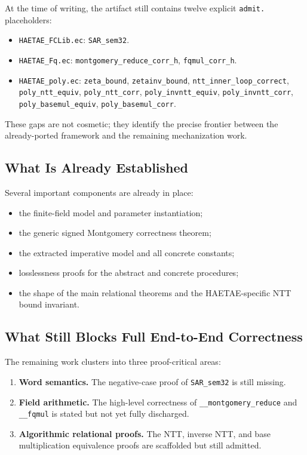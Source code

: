 \documentclass[11pt]{article}
\newcommand{\file}[1]{\texttt{#1}}
\newcommand{\ec}[1]{\texttt{#1}}
\newcommand{\todoec}{\textcolor{red!60!black}{\texttt{admit.}}}
\begin{document}
At the time of writing, the artifact still contains twelve explicit
\todoec{} placeholders:
\begin{itemize}[leftmargin=1.5em]
\item \file{HAETAE\_FCLib.ec}: \ec{SAR\_sem32}.
\item \file{HAETAE\_Fq.ec}: \ec{montgomery\_reduce\_corr\_h},
      \ec{fqmul\_corr\_h}.
\item \file{HAETAE\_poly.ec}: \ec{zeta\_bound}, \ec{zetainv\_bound},
      \ec{ntt\_inner\_loop\_correct}, \ec{poly\_ntt\_equiv},
      \ec{poly\_ntt\_corr}, \ec{poly\_invntt\_equiv},
      \ec{poly\_invntt\_corr}, \ec{poly\_basemul\_equiv},
      \ec{poly\_basemul\_corr}.
\end{itemize}

These gaps are not cosmetic; they identify the precise frontier between the
already-ported framework and the remaining mechanization work.

\subsection{What Is Already Established}

Several important components are already in place:
\begin{itemize}[leftmargin=1.5em]
\item the finite-field model and parameter instantiation;
\item the generic signed Montgomery correctness theorem;
\item the extracted imperative model and all concrete constants;
\item losslessness proofs for the abstract and concrete procedures;
\item the shape of the main relational theorems and the HAETAE-specific NTT
      bound invariant.
\end{itemize}

\subsection{What Still Blocks Full End-to-End Correctness}

The remaining work clusters into three proof-critical areas:
\begin{enumerate}[leftmargin=1.5em]
\item \textbf{Word semantics.} The negative-case proof of \ec{SAR\_sem32} is
      still missing.
\item \textbf{Field arithmetic.} The high-level correctness of
      \ec{\_\_montgomery\_reduce} and \ec{\_\_fqmul} is stated but not yet fully
      discharged.
\item \textbf{Algorithmic relational proofs.} The NTT, inverse NTT, and base
      multiplication equivalence proofs are scaffolded but still admitted.
\end{enumerate}
\end{document}
